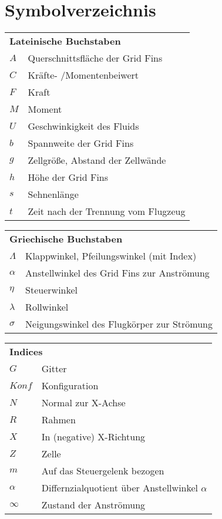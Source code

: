 \chapter*{Symbolverzeichnis}						%

\begin{longtable}[l]{ll}
\multicolumn{2}{l}{\textbf{Lateinische Buchstaben}}\\
$A$&Querschnittsfläche der Grid Fins\\
$C$&Kräfte- /Momentenbeiwert\\
$F$&Kraft\\
$M$&Moment\\
$U$&Geschwinkigkeit des Fluids\\
$b$&Spannweite der Grid Fins\\
$g$&Zellgröße, Abstand der Zellwände\\
$h$&Höhe der Grid Fins\\
$s$&Sehnenlänge\\
$t$&Zeit nach der Trennung vom Flugzeug\\
\end{longtable}


\begin{longtable}[l]{ll}
	\multicolumn{2}{l}{\textbf{Griechische Buchstaben}}\\
	$\Lambda$&Klappwinkel, Pfeilungswinkel (mit Index)\\
	$\alpha$&Anstellwinkel des Grid Fins zur Anströmung\\
	$\eta$&Steuerwinkel\\
	$\lambda$&Rollwinkel\\
	$\sigma$&Neigungswinkel des Flugkörper zur Strömung\\
\end{longtable}

\begin{longtable}[l]{ll}
	\multicolumn{2}{l}{\textbf{Indices}}\\
	$G$&Gitter\\
	$Konf$&Konfiguration\\
	$N$&Normal zur X-Achse\\
	$R$&Rahmen\\
	$X$&In (negative) X-Richtung\\
	$Z$&Zelle\\
	$m$&Auf das Steuergelenk bezogen\\
	$\alpha$&Differnzialquotient über Anstellwinkel $\alpha$\\
	$\infty$&Zustand der Anströmung\\
\end{longtable}

